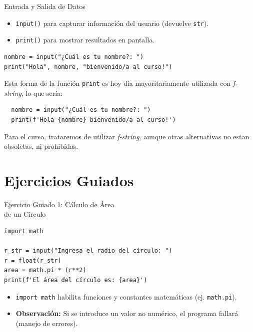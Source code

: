 \documentclass[10pt]{beamer}
\begin{document}
\begin{frame}[fragile]{Entrada y Salida de Datos}
\begin{itemize}
  \item \texttt{input()} para capturar información del usuario (devuelve \texttt{str}).
  \item \texttt{print()} para mostrar resultados en pantalla.
\end{itemize}
\begin{verbatim}
nombre = input("¿Cuál es tu nombre?: ")
print("Hola", nombre, "bienvenido/a al curso!")
\end{verbatim}

Esta forma de la función \texttt{print} es hoy día mayoritariamente utilizada con \textit{f-string}, lo que sería:

\begin{verbatim}
  nombre = input("¿Cuál es tu nombre?: ")
  print(f'Hola {nombre} bienvenido/a al curso!')
  \end{verbatim}

  Para el curso, trataremos de utilizar \textit{f-string}, aunque otras alternativas no estan obsoletas, ni prohibídas.
\end{frame}


\section{Ejercicios Guiados}


\begin{frame}[fragile]{Ejercicio Guiado 1: Cálculo de Área \\ de un Círculo}
\begin{verbatim}
import math

r_str = input("Ingresa el radio del círculo: ")
r = float(r_str)
area = math.pi * (r**2)
print(f'El área del círculo es: {area}')
\end{verbatim}
\begin{itemize}
  \item \texttt{import math} habilita funciones y constantes matemáticas (ej. \texttt{math.pi}).
  \item \textbf{Observación:} Si se introduce un valor no numérico, el programa fallará (manejo de errores).
\end{itemize}
\end{frame}
\end{document}
